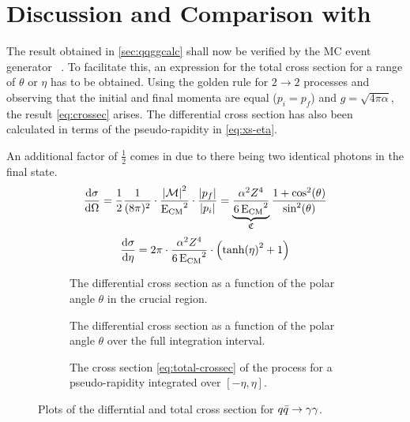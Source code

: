 \section{Discussion and Comparison with \sherpa}%
\label{sec:compsher}

The result obtained in \cref{sec:qqggcalc} shall now be verified by the
MC event generator \sherpa{}~\cite{Gleisberg:2008ta}. To
facilitate this, an expression for the total cross section for a range
of \(\theta\) or \(\eta\) has to be obtained. Using the golden rule
for \(2\rightarrow 2\) processes and observing that the initial and
final momenta are equal (\(p_i=p_f\)) and \(g=\sqrt{4\pi\alpha}\), the
result \cref{eq:crossec} arises. The differential cross section has
also been calculated in terms of the pseudo-rapidity
in \cref{eq:xs-eta}.

An additional factor of \(\frac{1}{2}\) comes in due to there being
two identical photons in the final state.
\begin{equation}
  \label{eq:crossec}
  \dv{\sigma}{\Omega} =
  \frac{1}{2}\frac{1}{(8\pi)^2}\cdot\frac{\abs{\mathcal{M}}^2}{\operatorname{E_{\text{CM}}}^2}\cdot\frac{\abs{p_f}}{\abs{p_i}}
  = \underbrace{\frac{\alpha^2Z^4}{6\operatorname{E_{\text{CM}}}^2}}_{\mathfrak{C}}\frac{1+\cos^2(\theta)}{\sin^2(\theta)}
\end{equation}
%
\begin{equation}
  \label{eq:xs-eta}
  \dv{\sigma}{\eta} = 2\pi\cdot\frac{\alpha^2Z^4}{6\operatorname{E_{\text{CM}}}^2}\cdot\qty(\tanh(\eta)^2 + 1)
\end{equation}
%
\begin{figure}[ht]
  \centering
  \begin{subfigure}[t]{.49\textwidth}
    \centering {}

    \caption[Plot of the differential cross section of the \(\qqgg\)
    process.]{\label{fig:diffxs_zoom} The differential cross section as a
      function of the polar angle \(\theta\) in the crucial region.}
  \end{subfigure}
  \begin{subfigure}[t]{.49\textwidth}
    \centering {}
    \caption[Plot of the differential cross section of the \(\qqgg\)
    process.]{\label{fig:diffxs} The differential cross section as a
      function of the polar angle \(\theta\) over the full integration
      interval. }
  \end{subfigure}
  \begin{subfigure}[t]{.49\textwidth}
  \centering
  \caption[Plot of the total cross section of the \(\qqgg\)
  process.]{\label{fig:totxs} The cross section
    \cref{eq:total-crossec} of the process for a pseudo-rapidity
    integrated over \([-\eta, \eta]\).}
\end{subfigure}
\caption{\label{fig:xsfirst} Plots of the differntial and total cross section
  for \(\qqgg\).}
\end{figure}
